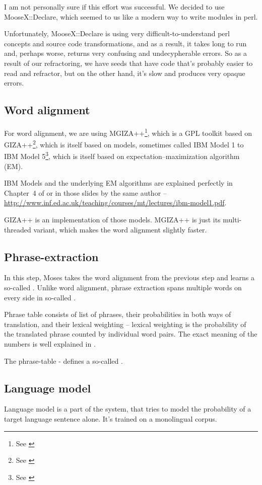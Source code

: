 I am not personally sure if this effort was successful. We decided to use MooseX::Declare, which seemed to us like a modern way to write modules in perl. 

Unfortunately, MooseX::Declare is using very difficult-to-understand perl concepts and source code transformations, and as a result, it takes long to run and, perhaps worse, returns very confusing and undecypherable errors. So as a result of our refractoring, we have seeds that have code that's probably easier to read and refractor, but on the other hand, it's slow and produces very opaque errors.

\subsection{Word alignment}
For word alignment, we are using MGIZA++\footnote{See \cite{mgiza}}, which is a GPL toolkit based on GIZA++\footnote{See \cite{giza}}, which is itself based on models, sometimes called IBM Model 1 to IBM Model 5\footnote{See \cite{ibm}}, which is itself based on expectation–maximization algorithm (EM).

IBM Models and the underlying EM algorithms are explained perfectly in Chapter~4 of \cite{koehn2010statistical} or in those slides by the same author -- \url{http://www.inf.ed.ac.uk/teaching/courses/mt/lectures/ibm-model1.pdf}.

GIZA++ is an implementation of those models. MGIZA++ is just its multi-threaded variant, which makes the word alignment slightly faster.

\subsection{Phrase-extraction}
In this step, Moses takes the word alignment from the previous step and learns a so-called .
Unlike word alignment, phrase extraction spans multiple words on every side in so-called .

Phrase table consists of list of phrases, their probabilities in both ways of translation, and their lexical weighting -- lexical weighting is the probability of the translated phrase counted by individual word pairs. The exact meaning of the numbers is well explained in \cite{koehn2003}.

The phrase-table - defines a so-called . 

\subsection{Language model}
Language model is a part of the system, that tries to model the probability of a target language sentence alone. It's trained on a monolingual corpus.

